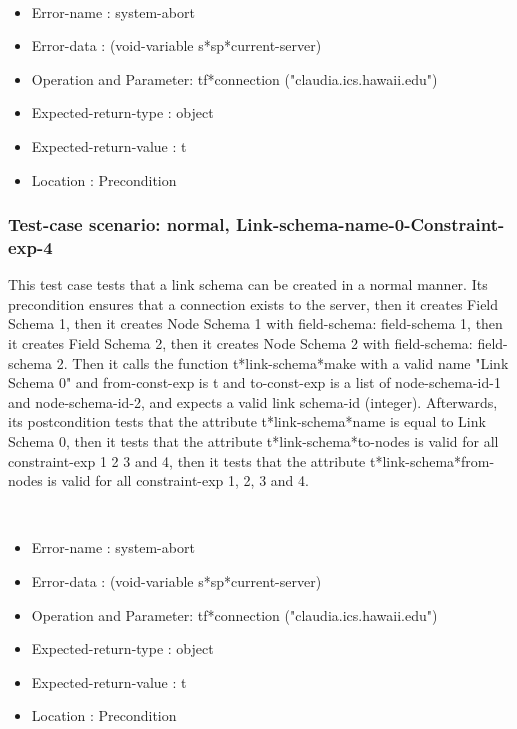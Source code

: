 \
\begin {itemize}
\item 	Error-name             : system-abort
\item Error-data             : (void-variable s*sp*current-server)
\item Operation and Parameter: tf*connection ("claudia.ics.hawaii.edu")
\item Expected-return-type   : object
\item Expected-return-value  : t
\item Location               : Precondition



\end {itemize}
\subsubsection {Test-case scenario: normal, Link-schema-name-0-Constraint-exp-4}


This test case tests that a link schema can be created in a normal manner.
Its precondition ensures that a connection exists to the server, then it creates Field Schema 1, then it creates Node Schema 1 with field-schema: field-schema 1, then it creates Field Schema 2, then it creates Node Schema 2 with field-schema: field-schema 2.
Then it calls the function t*link-schema*make  with a valid name "Link Schema 0" and from-const-exp is t and to-const-exp is a list of node-schema-id-1 and node-schema-id-2, and expects a valid link schema-id (integer).
Afterwards, its postcondition tests that the attribute t*link-schema*name is equal to Link Schema 0, then it tests that the attribute t*link-schema*to-nodes is valid for all constraint-exp 1 2 3 and 4, then it tests that the attribute t*link-schema*from-nodes is valid for all constraint-exp 1, 2, 3 and 4.


\
\begin {itemize}
\item 	Error-name             : system-abort
\item Error-data             : (void-variable s*sp*current-server)
\item Operation and Parameter: tf*connection ("claudia.ics.hawaii.edu")
\item Expected-return-type   : object
\item Expected-return-value  : t
\item Location               : Precondition



\end {itemize}
